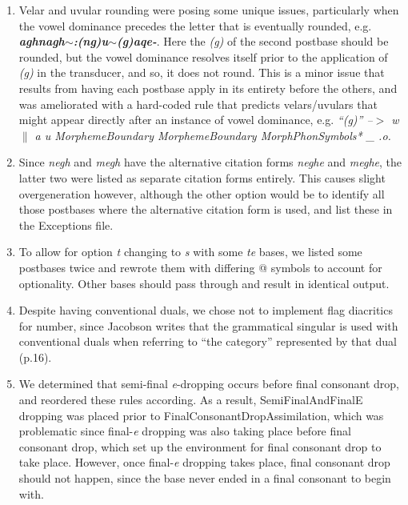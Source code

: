 \documentclass{article}
\begin{document}
\begin{enumerate}

\item Velar and uvular rounding were posing some unique issues, particularly when the vowel dominance precedes the letter that is eventually rounded, e.g. \textit{\textbf{aghnagh$\sim$:(ng)u$\sim$(g)aqe-}}.
%
Here the \textit{(g)} of the second postbase should be rounded, but the vowel dominance resolves itself prior to the application of \textit{(g)} in the transducer, and so, it does not round.
%
This is a minor issue that results from having each postbase apply in its entirety before the others, and was ameliorated with a hard-coded rule that predicts velars/uvulars that might appear directly after an instance of vowel dominance, e.g. \textit{``(g)'' --$>$ w $\|$ a u MorphemeBoundary MorphemeBoundary MorphPhonSymbols* \_ .o.}

\item Since \textit{negh} and \textit{megh} have the alternative citation forms \textit{neghe} and \textit{meghe}, the latter two were listed as separate citation forms entirely.
%
This causes slight overgeneration however, although the other option would be to identify all those postbases where the alternative citation form is used, and list these in the Exceptions file.

\item To allow for option \textit{t} changing to \textit{s} with some \textit{te} bases, we listed some postbases twice and rewrote them with differing @ symbols to account for optionality.
%
Other bases should pass through and result in identical output.

\item Despite having conventional duals, we chose not to implement flag diacritics for number, since Jacobson writes that the grammatical singular is used with conventional duals when referring to “the category” represented by that dual (p.16).

\item We determined that semi-final \textit{e}-dropping occurs before final consonant drop, and reordered these rules according.
%
As a result, SemiFinalAndFinalE dropping was placed prior to FinalConsonantDropAssimilation, which was problematic since final-\textit{e} dropping was also taking place before final consonant drop, which set up the environment for final consonant drop to take place.
%
However, once final-\textit{e} dropping takes place, final consonant drop should not happen, since the base never ended in a final consonant to begin with.


\end{enumerate}
\end{document}

